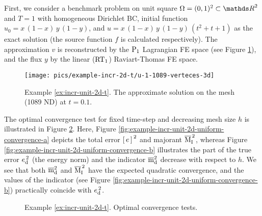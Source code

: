 \clearpage	
\begin{example}
\label{ex:incr-unit-2d-t}
First, we consider a benchmark problem on unit square \linebreak
$\Omega = (0, 1)^2 \subset \Rtwo$ 
and $T = 1$ with homogeneous Dirichlet BC, \linebreak
initial function $u_0 = x\,(1 - x)\,y\,(1 - y)$,
and $u = x\,(1 - x)\,y\,(1 - y)\,(t^2 + t + 1)$ as the exact solution
(the source function $f$ is calculated respectively). The approximation $v$ is 
reconstructed by the ${\rm P}_{1}$ Lagrangian FE space (see Figure 
\ref{fig:example-incr-unit-approx-2d-t}), and the flux $y$ by the linear (${\rm RT}_{1}$) 
Raviart-Thomas FE space.  

\begin{figure}[!ht]
	\centering
	\texttt{[image: pics/example-incr-2d-t/u-1-1089-verteces-3d]}
	\caption{Example \ref{ex:incr-unit-2d-t}. 
	The approximate solution on the mesh (1089 ND) at $t = 0.1$.}	
	\label{fig:example-incr-unit-approx-2d-t}	
\end{figure}

The optimal convergence test for fixed time-step and decreasing mesh size $h$ is 
illustrated in Figure \ref{fig:example-incr-unit-2d-uniform-convergence}. Here, 
Figure \ref{fig:example-incr-unit-2d-uniform-convergence-a} depicts the total error ${[\,e\,]\,}^2$
and majorant $\overline{\mathrm M}^{\,2}_{\mathrm{I}}$, whereas Figure \ref{fig:example-incr-unit-2d-uniform-convergence-b} 
illustrates the part of the true error ${e}^{\,2}_{\mathrm{d}}$ (the energy norm) and the indicator $\overline{\mathrm m}^2_{\mathrm{d}}$ decrease with respect to $h$. 
We see that both $\overline{\mathrm m}^2_{\mathrm{d}}$ and $\overline{\mathrm M}^{\,2}_{\mathrm{I}}$ have the expected quadratic convergence, and the values of the indicator (see Figure \ref{fig:example-incr-unit-2d-uniform-convergence-b}) practically coincide with ${e}^{\,2}_{\mathrm{d}}$.

\begin{figure}[!ht]
	\centering
	\quad
	\caption{Example \ref{ex:incr-unit-2d-t}. Optimal convergence tests.}
	\label{fig:example-incr-unit-2d-uniform-convergence}
\end{figure}
%


\end{example}
